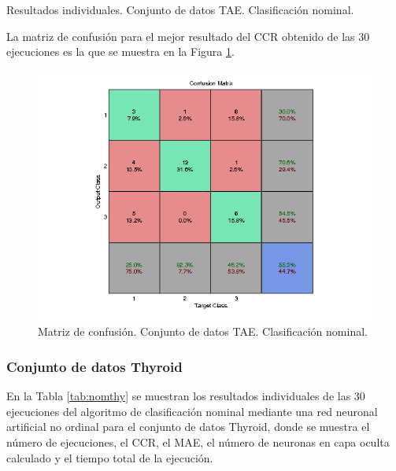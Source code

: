 			\begin{table}[!htbp]
				\centering
				\caption{Resultados individuales. Conjunto de datos TAE. Clasificación nominal.}
				\label{tab:nomtae}
			\end{table}
			
			La matriz de confusión para el mejor resultado del CCR obtenido de las 30 ejecuciones es la que se muestra en la Figura \ref{fig:nomtae}.
			
			\begin{figure}[htbp]
				\centering
				\includegraphics[scale=0.8]{../src/results/nominal/tae_mc16.png}
				\caption{Matriz de confusión. Conjunto de datos TAE. Clasificación nominal.}
				\label{fig:nomtae}
			\end{figure}

			\subsubsection{Conjunto de datos Thyroid}
			
			En la Tabla \ref{tab:nomthy} se muestran los resultados individuales de las 30 ejecuciones del algoritmo de clasificación nominal mediante una red neuronal artificial no ordinal para el conjunto de datos Thyroid, donde se muestra el número de ejecuciones, el CCR, el MAE, el número de neuronas en capa oculta calculado y el tiempo total de la ejecución.\\
			
